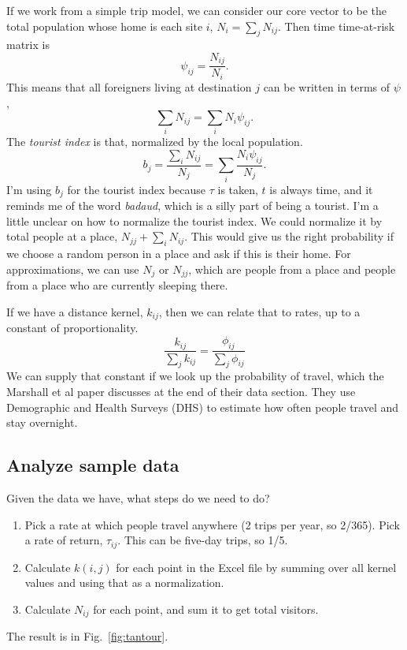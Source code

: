 \documentclass{article}
\begin{document}
If we work from a simple trip model, we can consider our core vector to be the total population whose home is each site $i$, $N_i=\sum_j N_{ij}$. Then time time-at-risk matrix is
\begin{equation}
  \psi_{ij}=\frac{N_{ij}}{N_i}.
\end{equation}
This means that all foreigners living at destination $j$ can be written in terms of $\psi$,
\begin{equation}
  \sum_i N_{ij} = \sum_i N_i\psi_{ij}.
\end{equation}
The \emph{tourist index} is that, normalized by the local population.
\begin{equation}
  b_j = \frac{\sum_i N_{ij}}{N_{j}} = \sum_i \frac{N_i\psi_{ij}}{N_{j}}.
\end{equation}
I'm using $b_j$ for the tourist index because $\tau$ is taken, $t$ is always time, and it reminds me of the word \emph{badaud}, which is a silly part of being a tourist. I'm a little unclear on how to normalize the tourist index. We could normalize it by total people at a place, $N_{jj} + \sum_i N_{ij}$. This would give us the right probability if we choose a random person in a place and ask if this is their home. For approximations, we can use $N_j$ or $N_{jj}$, which are people from a place and people from a place who are currently sleeping there.

If we have a distance kernel, $k_{ij}$, then we can relate that to rates, up to a constant of proportionality.
\begin{equation}
  \frac{k_{ij}}{\sum_j k_{ij}} = \frac{\phi_{ij}}{\sum_j \phi_{ij}}
\end{equation}
We can supply that constant if we look up the probability of travel, which the Marshall et al paper discusses at the end of their data section. They use Demographic and Health Surveys (DHS) to estimate how often people travel and stay overnight.

\subsection{Analyze sample data}

Given the data we have, what steps do we need to do?
\begin{enumerate}
  \item Pick a rate at which people travel anywhere (2 trips per year, so 2/365). Pick a rate of return, $\tau_{ij}$. This can be five-day trips, so 1/5.
  \item Calculate $k(i,j)$ for each point in the Excel file by summing over all kernel values and using that as a normalization.
  \item Calculate $N_{ij}$ for each point, and sum it to get total visitors.
\end{enumerate}
The result is in Fig.~\ref{fig:tantour}.
\end{document}
